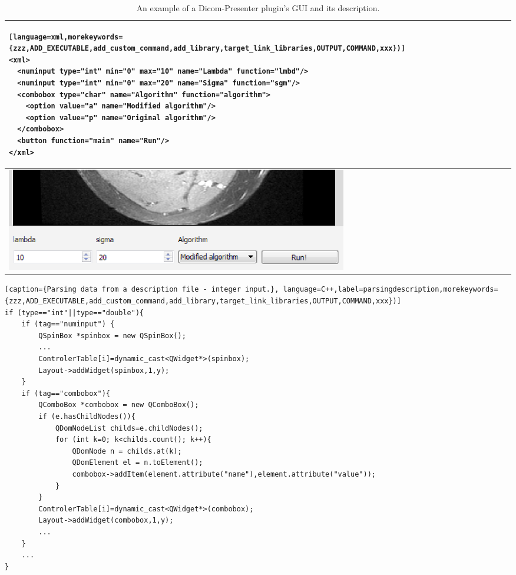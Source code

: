 \begin{table}[ht]
	\caption{An example of a Dicom-Presenter plugin's GUI and its description.\label{tab:exampledescription}}
	\begin{tabular}{|m{\textwidth}|}
	\hline
\begin{lstlisting}[language=xml,morekeywords={zzz,ADD_EXECUTABLE,add_custom_command,add_library,target_link_libraries,OUTPUT,COMMAND,xxx})]
<xml>
  <numinput type="int" min="0" max="10" name="Lambda" function="lmbd"/>
  <numinput type="int" min="0" max="20" name="Sigma" function="sgm"/>
  <combobox type="char" name="Algorithm" function="algorithm">
    <option value="a" name="Modified algorithm"/>
    <option value="p" name="Original algorithm"/>
  </combobox>
  <button function="main" name="Run"/>
</xml>
\end{lstlisting}
		\\
		  \hline		
		  \noalign{\smallskip}
			\includegraphics[width=\textwidth]{Text/IMG/Plugins.png}
		\\
		\hline
		\end{tabular}
\end{table}%

\lstset{numbers=left,frame=single,}

\begin{lstlisting}[caption={Parsing data from a description file - integer input.}, language=C++,label=parsingdescription,morekeywords={zzz,ADD_EXECUTABLE,add_custom_command,add_library,target_link_libraries,OUTPUT,COMMAND,xxx})]
if (type=="int"||type=="double"){
	if (tag=="numinput") {
		QSpinBox *spinbox = new QSpinBox();
		...
		ControlerTable[i]=dynamic_cast<QWidget*>(spinbox); 
		Layout->addWidget(spinbox,1,y);
	}	
	if (tag=="combobox"){
		QComboBox *combobox = new QComboBox();
		if (e.hasChildNodes()){
			QDomNodeList childs=e.childNodes();
			for (int k=0; k<childs.count(); k++){
				QDomNode n = childs.at(k);
				QDomElement el = n.toElement();
				combobox->addItem(element.attribute("name"),element.attribute("value"));
			}					
		}
		ControlerTable[i]=dynamic_cast<QWidget*>(combobox); 
		Layout->addWidget(combobox,1,y);
		...
	}
	...	
}
\end{lstlisting}




